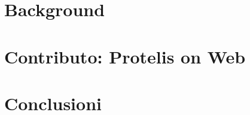 \documentclass[%
  a4paper,                %
  fontsize=12pt,          %
  oneside,                %
  openany,              %
  titlepage,              %
  final                   %
  headings=standardclasses, %
  headings=big,             %
  chapterprefix=false       %
]{scrbook}
\begin{document}
  \frontmatter{}

  
  
  
  

  \tableofcontents

  \mainmatter{}

  

  \part{Background}\label{part:background}
    
    
    

  \part{Contributo: Protelis on Web}\label{part:contribution}
    
    
    

  \part{Conclusioni}\label{part:conclusion}
    
    
    


  

  \backmatter{}
  
  
\end{document}
